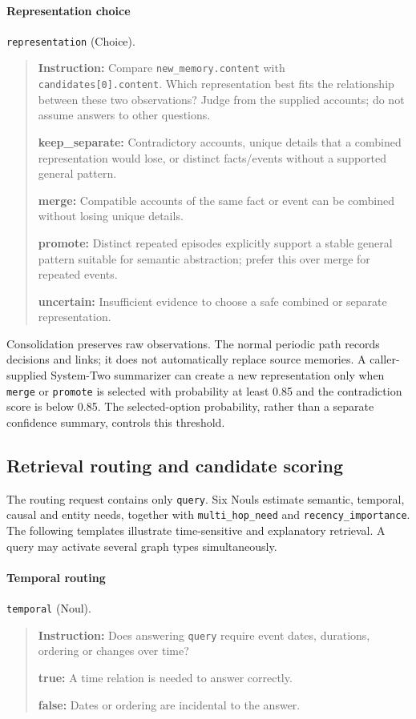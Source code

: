 \documentclass[11pt]{article}
\begin{document}
\paragraph{Representation choice} \texttt{representation} (Choice).
\begin{quote}\small
\noindent\textbf{Instruction:} Compare \texttt{new\_memory.content} with \texttt{candidates[0].content}. Which representation best fits the relationship between these two observations? Judge from the supplied accounts; do not assume answers to other questions.\par
\noindent\textbf{keep\_separate:} Contradictory accounts, unique details that a combined representation would lose, or distinct facts/events without a supported general pattern.\par
\noindent\textbf{merge:} Compatible accounts of the same fact or event can be combined without losing unique details.\par
\noindent\textbf{promote:} Distinct repeated episodes explicitly support a stable general pattern suitable for semantic abstraction; prefer this over merge for repeated events.\par
\noindent\textbf{uncertain:} Insufficient evidence to choose a safe combined or separate representation.\par
\end{quote}

Consolidation preserves raw observations. The normal periodic path records decisions and links; it does not automatically replace source memories. A caller-supplied System-Two summarizer can create a new representation only when \texttt{merge} or \texttt{promote} is selected with probability at least 0.85 and the contradiction score is below 0.85. The selected-option probability, rather than a separate confidence summary, controls this threshold.

\subsection{Retrieval routing and candidate scoring}

The routing request contains only \texttt{query}. Six Nouls estimate semantic, temporal, causal and entity needs, together with \texttt{multi\_hop\_need} and \texttt{recency\_importance}. The following templates illustrate time-sensitive and explanatory retrieval. A query may activate several graph types simultaneously.

\paragraph{Temporal routing} \texttt{temporal} (Noul).
\begin{quote}\small
\noindent\textbf{Instruction:} Does answering \texttt{query} require event dates, durations, ordering or changes over time?\par
\noindent\textbf{true:} A time relation is needed to answer correctly.\par
\noindent\textbf{false:} Dates or ordering are incidental to the answer.\par
\end{quote}
\end{document}
